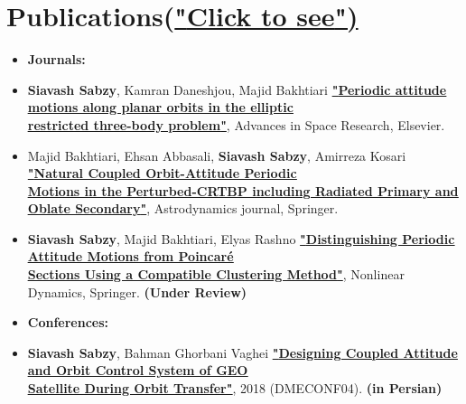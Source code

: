 \documentclass[10pt,a4paper,times]{moderncv}
\begin{document}
\section{Publications(\href{https://scholar.google.com/citations?user=pz4gpScAAAAJ&hl=en}{"\underline{Click to see}")}}
\begin{itemize}

\item\textbf{Journals:}
\item \textbf{Siavash Sabzy}, Kamran Daneshjou, Majid Bakhtiari 
 \textbf{\href{https://doi.org/10.1016/j.asr.2021.01.019}{"\underline{Periodic attitude motions along planar orbits in the elliptic } \\ \underline{restricted three-body problem}"}}, Advances in Space Research, Elsevier.
\item  Majid Bakhtiari, Ehsan Abbasali, \textbf{Siavash Sabzy}, Amirreza Kosari 
 \textbf{\href{https://link.springer.com/article/10.1007/s42064-022-0154-0}{"\underline{Natural Coupled Orbit-Attitude Periodic } \\ \underline{Motions in the Perturbed-CRTBP including Radiated Primary and Oblate Secondary}"}}, Astrodynamics journal, Springer.
\item \textbf{Siavash Sabzy}, Majid Bakhtiari, Elyas Rashno 
 \textbf{\href{ }{"\underline{Distinguishing Periodic Attitude Motions from Poincaré} \\ \underline{Sections Using a Compatible Clustering Method}"}}, Nonlinear Dynamics, Springer. \textbf{(Under Review)} \\


\item\textbf{Conferences:}
\item \textbf{Siavash Sabzy}, Bahman Ghorbani Vaghei
 \textbf{\href{https://civilica.com/doc/881918/}{"\underline{Designing Coupled Attitude and Orbit Control System of GEO} \\ \href{https://civilica.com/doc/881918/}{\underline{Satellite During Orbit Transfer"}}}}, 2018 (DMECONF04). \textbf{(in Persian)}
 

\end{itemize}
\end{document}
